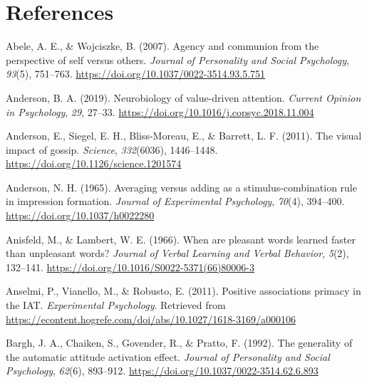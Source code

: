 \documentclass[
  man]{apa6}
\newlength{\cslhangindent}
\newlength{\cslentryspacingunit} %
\newenvironment{CSLReferences}[2] %
 {%
  \setlength{\parindent}{0pt}
  \ifodd #1
  \let\oldpar\par
  \def\par{\hangindent=\cslhangindent\oldpar}
  \fi
  \setlength{\parskip}{#2\cslentryspacingunit}
 }%
 {}
\begin{document}
\hypertarget{references}{%
\section{References}\label{references}}

\begingroup
\setlength{\parindent}{-0.5in}
\setlength{\leftskip}{0.5in}

\hypertarget{refs}{}
\begin{CSLReferences}{1}{0}
\leavevmode{}%
Abele, A. E., \& Wojciszke, B. (2007). Agency and communion from the perspective of self versus others. \emph{Journal of Personality and Social Psychology}, \emph{93}(5), 751--763. \url{https://doi.org/10.1037/0022-3514.93.5.751}

\leavevmode{}%
Anderson, B. A. (2019). Neurobiology of value-driven attention. \emph{Current Opinion in Psychology}, \emph{29}, 27--33. \url{https://doi.org/10.1016/j.copsyc.2018.11.004}

\leavevmode{}%
Anderson, E., Siegel, E. H., Bliss-Moreau, E., \& Barrett, L. F. (2011). The visual impact of gossip. \emph{Science}, \emph{332}(6036), 1446--1448. \url{https://doi.org/10.1126/science.1201574}

\leavevmode{}%
Anderson, N. H. (1965). Averaging versus adding as a stimulus-combination rule in impression formation. \emph{Journal of Experimental Psychology}, \emph{70}(4), 394--400. \url{https://doi.org/10.1037/h0022280}

\leavevmode{}%
Anisfeld, M., \& Lambert, W. E. (1966). When are pleasant words learned faster than unpleasant words? \emph{Journal of Verbal Learning and Verbal Behavior}, \emph{5}(2), 132--141. \url{https://doi.org/10.1016/S0022-5371(66)80006-3}

\leavevmode{}%
Anselmi, P., Vianello, M., \& Robusto, E. (2011). Positive associations primacy in the {IAT}. \emph{Experimental Psychology}. Retrieved from \url{https://econtent.hogrefe.com/doi/abs/10.1027/1618-3169/a000106}

\leavevmode{}%
Bargh, J. A., Chaiken, S., Govender, R., \& Pratto, F. (1992). The generality of the automatic attitude activation effect. \emph{Journal of Personality and Social Psychology}, \emph{62}(6), 893--912. \url{https://doi.org/10.1037/0022-3514.62.6.893}


\end{CSLReferences}
\end{document}
